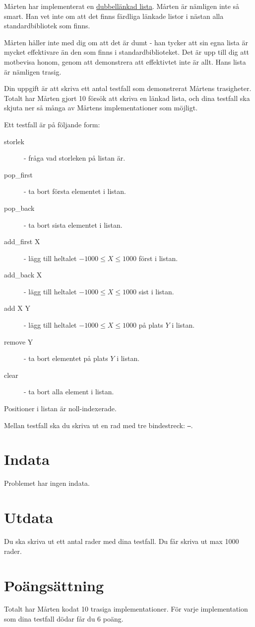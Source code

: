 
Mårten har implementerat en \href{https://en.wikipedia.org/wiki/Doubly\_linked\_list}{dubbellänkad lista}. Mårten är nämligen inte så smart. Han vet inte om att det finns färdliga länkade listor i nästan alla standardbibliotek som finns.

Mårten håller inte med dig om att det är dumt - han tycker att sin egna lista är mycket effektivare än den som finns i standardbiblioteket. Det är upp till dig att motbevisa honom, genom att demonstrera att effektivtet inte är allt. Hans lista är nämligen trasig.

Din uppgift är att skriva ett antal testfall som demonstrerat Mårtens trasigheter. Totalt har Mårten gjort 10 försök att skriva en länkad lista, och dina testfall ska skjuta ner så många av Mårtens implementationer som möjligt.

Ett testfall är på följande form:
\begin{description}
	\item[storlek] - fråga vad storleken på listan är.
	\item[pop\_first] - ta bort första elementet i listan.
	\item[pop\_back] - ta bort sista elementet i listan.
	\item[add\_first X] - lägg till heltalet $-1000 \le X \le 1000$ först i listan.
	\item[add\_back X] - lägg till heltalet $-1000 \le X \le 1000$ sist i listan.
	\item[add X Y] - lägg till heltalet $-1000 \le X \le 1000$ på plats $Y$ i listan.
	\item[remove Y] - ta bort elementet på plats $Y$ i listan.
	\item[clear] - ta bort alla element i listan.
\end{description}
Positioner i listan är noll-indexerade. 

Mellan testfall ska du skriva ut en rad med tre bindestreck: \texttt{---}.

\section*{Indata}
Problemet har ingen indata.

\section*{Utdata}
Du ska skriva ut ett antal rader med dina testfall. Du får skriva ut max 1000 rader.

\section*{Poängsättning}
Totalt har Mårten kodat 10 trasiga implementationer. För varje implementation som dina testfall dödar får du 6 poäng.
